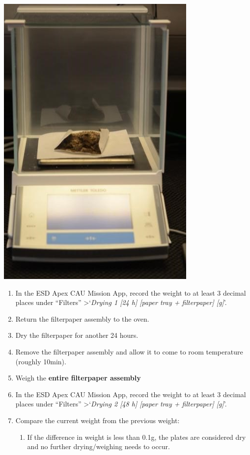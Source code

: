 \documentclass[]{book}
\providecommand{\tightlist}{%
  \setlength{\itemsep}{0pt}\setlength{\parskip}{0pt}}
\begin{document}
\includegraphics{images/CAU_weigh.jpg}

\begin{enumerate}
\def\labelenumi{\arabic{enumi}.}
\setcounter{enumi}{3}
\item
  In the ESD Apex CAU Mission App, record the weight to at least 3 decimal places under ``Filters'' \textgreater{}`\emph{Drying 1 {[}24 h{]} {[}paper tray + filterpaper{]} {[}g{]}}'.
\item
  Return the filterpaper assembly to the oven.
\item
  Dry the filterpaper for another 24 hours.
\item
  Remove the filterpaper assembly and allow it to come to room temperature (roughly 10min).
\item
  Weigh the \textbf{entire filterpaper assembly}
\item
  In the ESD Apex CAU Mission App, record the weight to at least 3 decimal places under ``Filters'' \textgreater{}`\emph{Drying 2 {[}48 h{]} {[}paper tray + filterpaper{]} {[}g{]}}'.
\item
  Compare the current weight from the previous weight:

  \begin{enumerate}
  \def\labelenumii{\alph{enumii})}
  \tightlist
  \item
    If the difference in weight is less than 0.1g, the plates are considered dry and no further drying/weighing needs to occur.
  \end{enumerate}
\end{enumerate}
\end{document}
